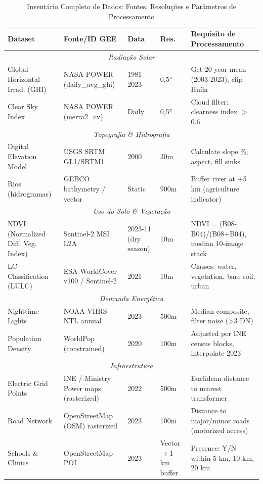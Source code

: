 \documentclass[12pt, a4paper]{article}
\begin{document}
{{{{{{{{{{{{\begin{table}[H]
\centering
\caption{Inventário Completo de Dados: Fontes, Resoluções e Parâmetros de Processamento}
\label{tab:data_inventory}
\footnotesize
\begin{tabular}{|l|l|l|l|l|}
\hline
\textbf{Dataset} & \textbf{Fonte/ID GEE} & \textbf{Data} & \textbf{Res.} & \textbf{Requisito de Processamento} \\
\hline
\multicolumn{5}{|c|}{\textit{Radiação Solar}} \\
\hline
Global Horizontal Irrad. (GHI) & NASA POWER (daily\_avg\_ghi) & 1981-2023 & 0,5° & Get 20-year mean (2003-2023), clip Huíla \\
Clear Sky Index & NASA POWER (merra2\_cv) & Daily & 0,5° & Cloud filter: clearness index $>$ 0.6 \\
\hline
\multicolumn{5}{|c|}{\textit{Topografia \& Hidrografia}} \\
\hline
Digital Elevation Model & USGS SRTM GL1/SRTM1 & 2000 & 30m & Calculate slope \%, aspect, fill sinks \\
Rios (hidrogramas) & GEBCO bathymetry / vector & Static & 900m & Buffer river at +5 km (agriculture indicator) \\
\hline
\multicolumn{5}{|c|}{\textit{Uso do Solo \& Vegetação}} \\
\hline
NDVI (Normalized Diff. Veg. Index) & Sentinel-2 MSI L2A & 2023-11 (dry season) & 10m & NDVI = (B08-B04)/(B08+B04), median 10-image stack \\
LC Classification (LULC) & ESA WorldCover v100 / Sentinel-2 & 2021 & 10m & Classes: water, vegetation, bare soil, urban \\
\hline
\multicolumn{5}{|c|}{\textit{Demanda Energética}} \\
\hline
Nighttime Lights & NOAA VIIRS NTL annual & 2023 & 500m & Median composite, filter noise (>3 DN) \\
Population Density & WorldPop (constrained) & 2020 & 100m & Adjusted per INE census blocks, interpolate 2023 \\
\hline
\multicolumn{5}{|c|}{\textit{Infraestrutura}} \\
\hline
Electric Grid Points & INE / Ministry Power maps (rasterized) & 2022 & 500m & Euclidean distance to nearest transformer \\
Road Network & OpenStreetMap (OSM) rasterized & 2023 & 100m & Distance to major/minor roads (motorized access) \\
Schools \& Clinics & OpenStreetMap POI & 2023 & Vector → 1 km buffer & Presence: Y/N within 5 km, 10 km, 20 km \\
\hline
\end{tabular}
\end{table}

}}}}}}}}}}}}
\end{document}
